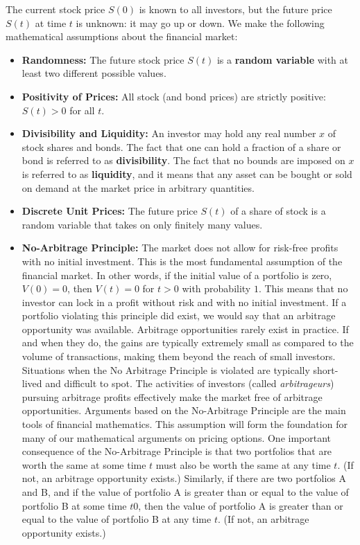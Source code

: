 \documentclass[letterpaper,10pt]{article}
\begin{document}
The current stock price $S(0)$ is known to all investors, but the future price $S(t)$ at time $t$ is unknown: it may go up or down.  We make the following mathematical assumptions about the financial market:

\begin{itemize}

\item {\bf Randomness:} The future stock price $S(t)$ is a {\bf random variable} with at least two different possible values.  

\item {\bf Positivity of Prices:} All stock (and bond prices) are strictly positive:  $S(t)>0$ for all $t$.





\item {\bf Divisibility and Liquidity:} An investor may hold any real number $x$ of stock shares and bonds.
The fact that one can hold a fraction of a share or bond is referred to as {\bf divisibility}.  The fact that no bounds are imposed on $x$ is referred to as {\bf liquidity}, and it means that any asset can be bought or sold on demand at the market price in arbitrary quantities.  



\item {\bf Discrete Unit Prices:} The future price $S(t)$ of a share of stock is a random variable that takes on only finitely many values.



\item {\bf No-Arbitrage Principle:} The market does not allow for risk-free profits with no initial investment.  This is the most fundamental assumption of the financial market.  In other words, if the initial value of a portfolio is zero, $V (0) = 0$, then $V (t) = 0$ for $t>0$ with probability $1$. This means that no investor can lock in a profit without risk and with no initial investment. If a portfolio violating this principle did exist, we would say that an arbitrage opportunity was available.  Arbitrage opportunities rarely exist in practice. If and when they do, the gains are typically extremely small as compared to the volume of transactions, making them beyond the reach of small investors. Situations when the No Arbitrage Principle is violated are typically short-lived and difficult to spot. The activities of investors (called {\em arbitrageurs}) pursuing arbitrage profits effectively make the market free of arbitrage opportunities.  Arguments based on the No-Arbitrage Principle are the main tools of financial mathematics.  This assumption will form the foundation for many of our mathematical arguments on pricing options.  One important consequence of the No-Arbitrage Principle is that two portfolios that are worth the same at some time $t$ must also be worth the same at any time $t$.  (If not, an arbitrage opportunity exists.)  Similarly, if there are two portfolios A and B, and if the value of portfolio A is greater than or equal to the value of portfolio B at some time $t0$, then the value of portfolio A is greater than or equal to the value of portfolio B at any time $t$. (If not, an arbitrage opportunity exists.)





\end{itemize}
\end{document}
